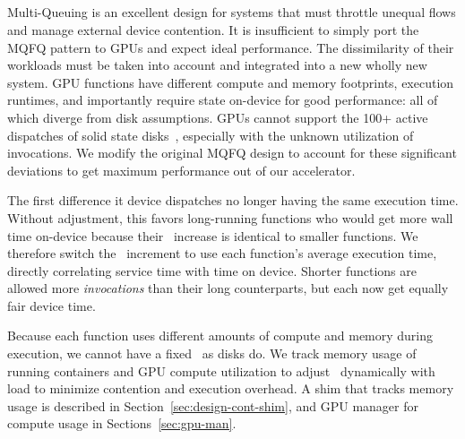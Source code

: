 \subsection{\QNameFull}
\label{sec:mq}


Multi-Queuing is an excellent design for systems that must throttle unequal flows and manage external device contention.
It is insufficient to simply port the MQFQ pattern to GPUs and expect ideal performance.
The dissimilarity of their workloads must be taken into account and integrated into a new wholly new system.
GPU functions have different compute and memory footprints, execution runtimes, and importantly require state on-device for good performance: all of which diverge from disk assumptions.
GPUs cannot support the 100+ active dispatches of solid state disks~\cite{hedayati2019multi}, especially with the unknown utilization of invocations.
We modify the original MQFQ design to account for these significant deviations to get maximum performance out of our accelerator.


The first difference it device dispatches no longer having the same execution time.
Without adjustment, this favors long-running functions who would get more wall time on-device because their \VT~increase is identical to smaller functions.
We therefore switch the \VT~increment to use each function's average execution time, directly correlating service time with time on device. 
Shorter functions are allowed more \emph{invocations} than their long counterparts, but each now get equally fair device time.

Because each function uses different amounts of compute and memory during execution, we cannot have a fixed \D~as disks do.
We track memory usage of running containers and GPU compute utilization to adjust \D~dynamically with load to minimize contention and execution overhead.
A shim that tracks memory usage is described in Section~\ref{sec:design-cont-shim}, and GPU manager for compute usage in Sections~\ref{sec:gpu-man}.

